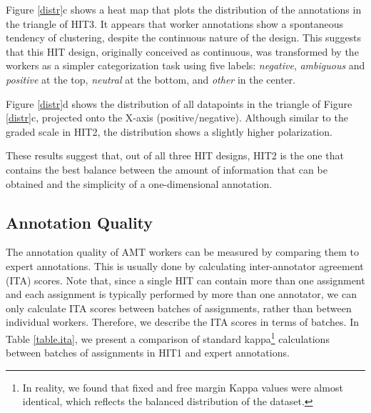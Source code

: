 \documentclass[11pt,letterpaper]{article}
\begin{document}
Figure \ref{distr}c shows a heat map that plots the distribution of the annotations in the triangle of HIT3. It appears that worker annotations show a spontaneous tendency of clustering, despite the continuous nature of the design. This suggests that this HIT design, originally conceived as continuous, was transformed by the workers as a simpler categorization task using five labels: \textit{negative}, \textit{ambiguous} and \textit{positive} at the top, \textit{neutral} at the bottom, and \textit{other} in the center.


Figure \ref{distr}d shows the distribution of all datapoints in the triangle of Figure \ref{distr}c, projected onto the X-axis (positive/negative). Although similar to the graded scale in HIT2, the distribution shows a slightly higher polarization.

These results suggest that, out of all three HIT designs, HIT2 is the one that contains the best balance between the amount of information that can be obtained and the simplicity of a one-dimensional annotation. 



\subsection{Annotation Quality}
\label{sect:quality}

The annotation quality of AMT workers can be measured by comparing them to expert annotations. This is usually done by calculating inter-annotator agreement (ITA) scores. Note that, since a single HIT can contain more than one assignment and each assignment is typically performed by more than one annotator, we can only calculate ITA scores between batches of assignments, rather than between individual workers. Therefore, we describe the ITA scores in terms of batches. In Table \ref{table.ita}, we present a comparison of standard kappa\footnote{In reality, we found that fixed and free margin Kappa values were almost identical, which reflects the balanced distribution of the dataset.} calculations \cite{eugenio_kappa_2004} between batches of assignments in HIT1 and expert annotations.
\end{document}
